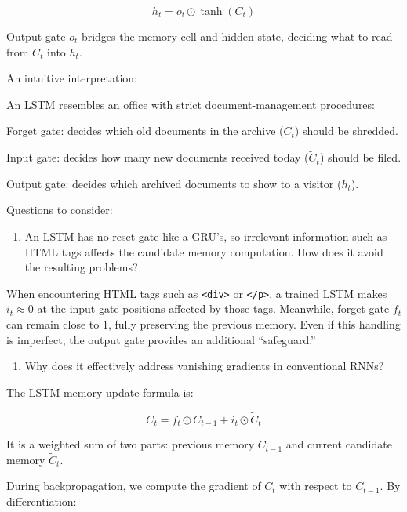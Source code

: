 \[
h_t = o_t \odot \tanh(C_t)
\]

Output gate \(o_t\) bridges the memory cell and hidden state, deciding what to read from \(C_t\) into \(h_t\).

An intuitive interpretation:

An LSTM resembles an office with strict document-management procedures:

Forget gate: decides which old documents in the archive (\(C_t\)) should be shredded.

Input gate: decides how many new documents received today (\(\tilde{C}_t\)) should be filed.

Output gate: decides which archived documents to show to a visitor (\(h_t\)).

Questions to consider:

\begin{enumerate}
\def\labelenumi{\arabic{enumi}.}
\tightlist
\item
  An LSTM has no reset gate like a GRU's, so irrelevant information such as HTML tags affects the candidate memory computation. How does it avoid the resulting problems?
\end{enumerate}

When encountering HTML tags such as \texttt{\textless{}div\textgreater{}} or \texttt{\textless{}/p\textgreater{}}, a trained LSTM makes \(i_t \approx 0\) at the input-gate positions affected by those tags. Meanwhile, forget gate \(f_t\) can remain close to \(1\), fully preserving the previous memory. Even if this handling is imperfect, the output gate provides an additional ``safeguard.''

\begin{enumerate}
\def\labelenumi{\arabic{enumi}.}
\setcounter{enumi}{1}
\tightlist
\item
  Why does it effectively address vanishing gradients in conventional RNNs?
\end{enumerate}

The LSTM memory-update formula is:

\[
C_t = f_t \odot C_{t-1} + i_t \odot \tilde{C}_t
\]

It is a weighted sum of two parts: previous memory \(C_{t-1}\) and current candidate memory \(\tilde{C}_t\).

During backpropagation, we compute the gradient of \(C_t\) with respect to \(C_{t-1}\). By differentiation:

